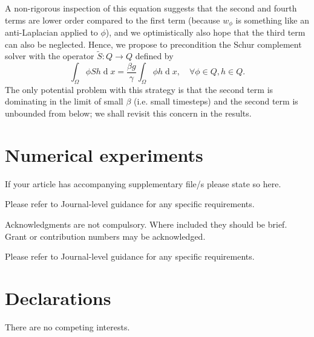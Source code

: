 \documentclass[pdflatex,sn-mathphys]{sn-jnl}%
\theoremstyle{thmstyleone}%
\theoremstyle{thmstyletwo}%
\theoremstyle{thmstylethree}%
\DeclareMathOperator{\diff}{d}
\begin{document}
A non-rigorous inspection of this equation suggests that the second
and fourth terms are lower order compared to the first term (because
$w_\phi$ is something like an anti-Laplacian applied to $\phi$), and
we optimistically also hope that the third term can also be
neglected. Hence, we propose to precondition the Schur complement
solver with the operator $\tilde{S}:Q\to Q$ defined by
\begin{equation}
  \int_\Omega \phi Sh \diff x = \frac{\beta g}{\gamma}\int_\Omega
  \phi h \diff x, \quad \forall \phi \in Q, h \in Q.
\end{equation}
The only potential problem with this strategy is that the
second term is dominating in the limit of small $\beta$ (i.e. small
timesteps) and the second term is unbounded from below; we shall
revisit this concern in the results.


\section{Numerical experiments}\label{sec:numerics}

\backmatter


If your article has accompanying supplementary file/s please state so here. 

Please refer to Journal-level guidance for any specific requirements.


Acknowledgments are not compulsory. Where included they should be brief. Grant or contribution numbers may be acknowledged.

Please refer to Journal-level guidance for any specific requirements.

\section*{Declarations}

There are no competing interests.


\end{document}
